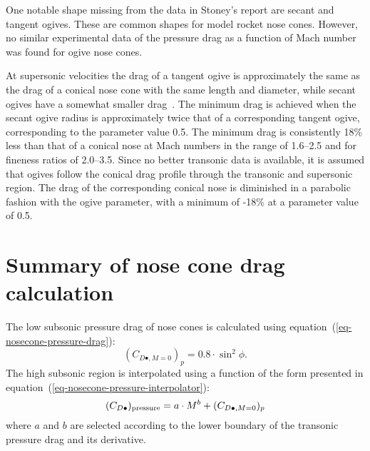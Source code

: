 One notable shape missing from the data in Stoney's report are secant
and tangent ogives.  These are common shapes for model rocket nose
cones.  However, no similar experimental data of the pressure drag as
a function of Mach number was found for ogive nose cones.

At supersonic velocities the drag of a tangent ogive is approximately
the same as the drag of a conical nose cone with the same length and
diameter, while secant ogives have a somewhat smaller
drag~\cite[p.~239]{handbook-supersonic-aerodynamics}.  The minimum
drag is achieved when the secant ogive radius is approximately twice
that of a corresponding tangent ogive, corresponding to the parameter
value 0.5.  The minimum drag is consistently 18\% less than that of a
conical nose at Mach numbers in the range of 1.6--2.5 and for fineness
ratios of 2.0--3.5.  Since no better transonic data is available, it
is assumed that ogives follow the conical drag profile through
the transonic and supersonic region.  The drag of the corresponding
conical nose is diminished in a parabolic fashion with the ogive
parameter, with a minimum of -18\% at a parameter value of 0.5.





\section{Summary of nose cone drag calculation}
\label{app-transonic-nosecone-summary}

The low subsonic pressure drag of nose cones is calculated using
equation~(\ref{eq-nosecone-pressure-drag}):
%
\begin{equation*}
(C_{D\bullet,M=0})_p = 0.8 \cdot \sin^2\phi.
\end{equation*}
%
The high subsonic region is interpolated using a function of the form
presented in equation~(\ref{eq-nosecone-pressure-interpolator}):
%
\begin{equation*}
(C_{D\bullet})_{\rm pressure} = a\cdot M^b + (C_{D\bullet,M=0})_p
\end{equation*}
%
where $a$ and $b$ are selected according to the lower boundary of the
transonic pressure drag and its derivative.

